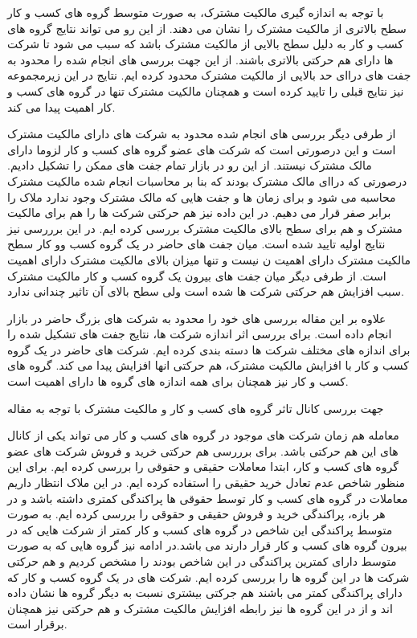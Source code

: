 \documentclass[12pt, a4paper]{article}
\begin{document}
با توجه به اندازه گیری مالکیت مشترک، به صورت متوسط گروه های کسب و کار سطح بالاتری از مالکیت مشترک را نشان می دهند. از این رو می تواند نتایج گروه های کسب و کار به دلیل سطح بالایی از مالکیت مشترک باشد که سبب می شود تا شرکت ها دارای هم حرکتی بالاتری باشند. از این جهت بررسی های انجام شده را محدود به جفت های دراای حد بالایی از مالکیت مشترک محدود کرده ایم. نتایج در این زیرمجموعه نیز نتایج قبلی را تایید کرده است و همچنان مالکیت مشترک تنها در گروه های کسب و کار اهمیت پیدا می کند. 

از طرفی دیگر بررسی های انجام شده محدود به شرکت های دارای مالکیت مشترک است و این درصورتی است که شرکت های عضو گروه های کسب و کار لزوما دارای مالک مشترک نیستند. از این رو در بازار تمام جفت های ممکن را تشکیل دادیم. درصورتی که دراای مالک مشترک بودند که بنا بر محاسبات انجام شده مالکیت مشترک محاسبه می شود و برای زمان ها و جفت هایی که مالک مشترک وجود ندارد ملاک را برابر صفر قرار می دهیم. در این داده نیز هم حرکتی شرکت ها را هم برای مالکیت مشترک و هم برای سطح بالای مالکیت مشترک بررسی کرده ایم. در این برررسی نیز نتایج اولیه تایید شده است. میان جفت های حاضر در یک گروه کسب وو کار سطح مالکیت مشترک دارای اهمیت ن نیست و تنها میزان بالای مالکیت مشترک دارای اهمیت است. از طرفی دیگر میان جفت های بیرون یک گروه کسب و کار مالکیت مشترک سبب افزایش هم حرکتی شرکت ها شده است ولی سطح بالای آن تاثیر چندانی ندارد.

علاوه بر این مقاله 
بررسی های خود را محدود به شرکت های بزرگ حاضر در بازار انجام داده است. برای بررسی اثر اندازه شرکت ها، نتایج جفت های تشکیل شده را برای اندازه های مختلف شرکت ها دسته بندی کرده ایم. شرکت های حاضر در یک گروه کسب و کار با افزایش مالکیت مشترک، هم حرکتی انها افزایش پیدا می کند. گروه های کسب و کار نیز همچنان برای همه اندازه های گروه ها دارای اهمیت است.

جهت بررسی کانال تاثر گروه های کسب و کار و مالکیت مشترک با توجه به مقاله 


معامله هم زمان شرکت های موجود در گروه های کسب و کار می تواند یکی از کانال های این هم حرکتی باشد. برای برررسی هم حرکتی خرید و فروش شرکت های عضو گروه های کسب و کار، ابتدا معاملات حقیقی و حقوقی را بررسی کرده ایم. برای این منظور شاخص عدم تعادل خرید حقیقی را استفاده کرده ایم. در این ملاک انتظار داریم معاملات در گروه های کسب و کار توسط حقوقی ها پراکندگی کمتری داشته باشد و در هر بازه، پراکندگی خرید و فروش حقیقی و حقوقی را بررسی کرده ایم. به صورت متوسط پراکندگی این شاخص در گروه های کسب و کار کمتر از شرکت هایی که در بیرون گروه های کسب و کار قرار دارند می باشد.در ادامه نیز گروه هایی که به صورت متوسط دارای کمترین پراکندگی در این شاخص بودند را مشخص کردیم و هم حرکتی شرکت ها در این گروه ها را بررسی کرده ایم. شرکت های در یک گروه کسب و کار که دارای پراکندگی کمتر می باشند هم جرکتی بیشتری نسبت به دیگر گروه ها نشان داده اند و از در این گروه ها نیز رابطه افزایش مالکیت مشترک و هم حرکتی نیز همچنان برقرار است.
\end{document}
